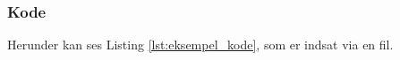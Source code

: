 \newpage
\subsubsection{Kode}
Herunder kan ses Listing \ref{lst:eksempel_kode}, som er indsat via en fil.


